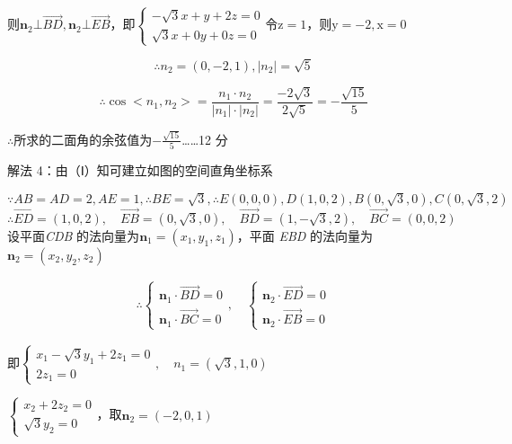 \documentclass{scrbook}
\begin{document}
则$\mathbf{n}_{2}\bot \overset{\rightarrow }{BD},\mathbf{n}_{2}\bot \overset{\rightarrow }{EB}$，即$\left\{\begin{array}{l}
- \sqrt{3}x+y+2z=0\\
\sqrt{3}x+0y+0z=0
\end{array}\right.$令$\mathrm{z}=1$，则$\mathrm{y}=-2,\mathrm{x}=0$

\begin{equation*}
\therefore n_{2}=(0,- 2,1),\left|n_{2}\right|=\sqrt{5}
\end{equation*}

\begin{equation*}
\therefore \cos <n_{1},n_{2}>=\frac{n_{1}\cdot n_{2}}{\left|n_{1}\right|\cdot \left|n_{2}\right|}=\frac{- 2\sqrt{3}}{2\sqrt{5}}=- \frac{\sqrt{15}}{5}
\end{equation*}

${\therefore}$所求的二面角的余弦值为$- \frac{\sqrt{15}}{5}${\ldots}{\ldots}12 分

解法 4：由（Ⅰ）知可建立如图的空间直角坐标系

$\because AB=AD=2,AE=1,\therefore BE=\sqrt{3},\therefore E(0,0,0),D(1,0,2),B(0,\sqrt{3},0),C(0,\sqrt{3},2)$$\therefore \overset{\rightarrow }{ED}=(1,0,2),{\quad} \overset{\rightarrow }{EB}=(0,\sqrt{3},0),{\quad} \overset{\rightarrow }{BD}=(1,- \sqrt{3},2),{\quad} \overset{\rightarrow }{BC}=(0,0,2)$设平面\textit{CDB} 的法向量为$\mathbf{n}_{1}=\left(x_{1},y_{1},z_{1}\right)$，平面 \textit{EBD} 的法向量为$\mathbf{n}_{2}=\left(x_{2},y_{2},z_{2}\right)$

\begin{align*}
\therefore \left\{\begin{array}{l}
\mathbf{n}_{1}\cdot \overset{\rightarrow }{BD}=0\\
\mathbf{n}_{1}\cdot \overset{\rightarrow }{BC}=0
\end{array}\right.,{\quad} \left\{\begin{array}{l}
\mathbf{n}_{2}\cdot \overset{\rightarrow }{ED}=0\\
\mathbf{n}_{2}\cdot \overset{\rightarrow }{EB}=0
\end{array}\right.
\end{align*}

即$\left\{\begin{array}{l}
x_{1}- \sqrt{3}y_{1}+2z_{1}=0\\
2z_{1}=0
\end{array}\right.,{\quad} n_{1}=(\sqrt{3},1,0)$

$\left\{\begin{array}{l}
x_{2}+2z_{2}=0\\
\sqrt{3}y_{2}=0
\end{array}\right.$，取$\mathbf{n}_{2}=(- 2,0,1)$
\end{document}
